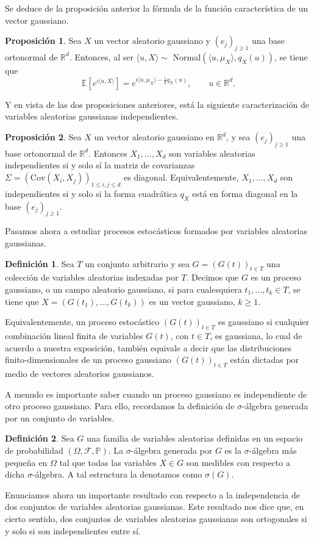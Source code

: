 \documentclass[letterpaper,twoside,12pt]{book}
\newcommand{\R}{\mathbb{R}}
\newcommand{\F}{\mathcal{F}}
\newcommand{\E}{\mathbb{E}}
\renewcommand{\P}{\mathbb{P}}
\newcommand{\1}{\mathds{1}}
\theoremstyle{definition}
\newtheorem{dfn}{Definición}
\theoremstyle{definition}
\theoremstyle{remark}
\theoremstyle{definition}
\theoremstyle{definition}
\newtheorem{prop}{Proposición}
\theoremstyle{definition}
\theoremstyle{definition}
\theoremstyle{definition}
\begin{document}
Se deduce de la proposición anterior la fórmula de la función característica de un vector gaussiano.
\begin{prop} 
 Sea $X$ un vector aleatorio gaussiano y $(e_j)_{j\geq1}$ una base ortonormal de $\R^{d}$. Entonces, al ser $\langle u,X\rangle\sim$ Normal$(\langle u,\mu_X\rangle,q_X(u))$, se tiene que %
 \[
 \E\left[e^{i\langle u,X\rangle}\right]=e^{i \langle u,\mu_X\rangle-\frac{1}{2}q_X(u)}, \qquad u\in \R^d.
 \]
 \end{prop}
Y en vista de las dos proposiciones anteriores, está la siguiente caracterización de variables aleatorias gaussianas independientes.
\begin{prop} 
 Sea $X$ un vector aleatorio gaussiano en $\R^{d}$, y sea $(e_j)_{j\geq1}$ una base ortonormal de $\R^{d}$. Entonces $X_1,...,X_d$ son variables aleatorias independientes si y solo sí la matriz de covarianzas $\Sigma=(\text{Cov}\left(X_i,X_j\right))_{1\leq i,j\leq d}$ es diagonal. Equivalentemente, $X_1,...,X_d$ son independientes si y solo si la forma cuadrática $q_X$ está en forma diagonal en la base $(e_j)_{j\geq1}$.
 \end{prop}

 Pasamos ahora a estudiar procesos estocásticos formados por variables aleatorias gaussianas.
\begin{dfn} 
 Sea $T$ un conjunto arbitrario y sea $G=(G(t))_{t\in T}$ una colección de variables aleatorias indexadas por $T$. Decimos que $G$ es un proceso gaussiano, o un campo aleatorio gaussiano, si para cualesquiera $t_1,...,t_k\in T$, se tiene que $X=(G(t_1),...,G(t_k))$ es un vector gaussiano, $k\geq1$. 
\end{dfn}

Equivalentemente, un proceso estocástico $(G(t))_{t\in T}$ es gaussiano si cualquier combinación lineal finita de variables $G(t)$, con $t\in T$, es gaussiana, lo cual de acuerdo a nuestra exposición, también equivale a decir que las distribuciones finito-dimensionales de un proceso gaussiano $(G(t))_{t\in T}$ están dictadas por medio de vectores aleatorios gaussianos.

A menudo es importante saber cuando un proceso gaussiano es independiente de otro proceso gaussiano. Para ello, recordamos la definición de $\sigma$-álgebra generada por un conjunto de variables.

\begin{dfn} 
 Sea $G$ una familia de variables aleatorias definidas en un espacio de probabilidad $(\Omega, \F, \P)$. La $\sigma$-álgebra generada por $G$ es la $\sigma$-álgebra más pequeña en $\Omega$ tal que todas las variables $X\in G$ son medibles con respecto a dicha $\sigma$-álgebra. A tal estructura la denotamos como $\sigma(G)$.  
 \end{dfn}
Enunciamos ahora un importante resultado con respecto a la independencia de dos conjuntos de variables aleatorias gaussianas. Este resultado nos dice que, en cierto sentido, dos conjuntos de variables aleatorias gaussianas son ortogonales si y solo si son independientes entre sí. 
\end{document}
